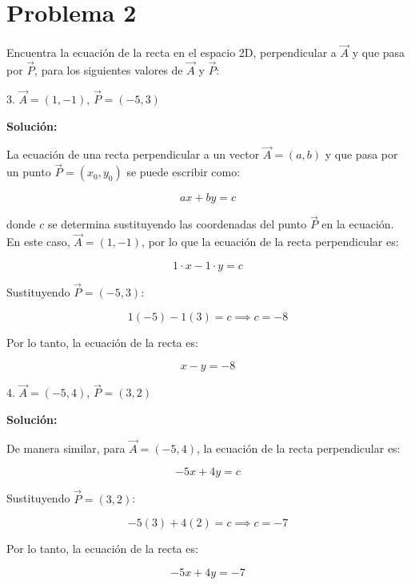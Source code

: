 \section*{Problema 2}

Encuentra la ecuación de la recta en el espacio 2D, perpendicular a $\vec{A}$ y que pasa por $\vec{P}$, para los siguientes valores de $\vec{A}$ y $\vec{P}$:

3. $\vec{A} = (1, -1)$, $\vec{P} = (-5, 3)$

\textbf{Solución:}

La ecuación de una recta perpendicular a un vector $\vec{A} = (a, b)$ y que pasa por un punto $\vec{P} = (x_0, y_0)$ se puede escribir como:

\[
ax + by = c
\]

donde $c$ se determina sustituyendo las coordenadas del punto $\vec{P}$ en la ecuación. En este caso, $\vec{A} = (1, -1)$, por lo que la ecuación de la recta perpendicular es:

\[
1 \cdot x - 1 \cdot y = c
\]

Sustituyendo $\vec{P} = (-5, 3)$:

\[
1(-5) - 1(3) = c \implies c = -8
\]

Por lo tanto, la ecuación de la recta es:

\[
x - y = -8
\]

4. $\vec{A} = (-5, 4)$, $\vec{P} = (3, 2)$

\textbf{Solución:}

De manera similar, para $\vec{A} = (-5, 4)$, la ecuación de la recta perpendicular es:

\[
-5x + 4y = c
\]

Sustituyendo $\vec{P} = (3, 2)$:

\[
-5(3) + 4(2) = c \implies c = -7
\]

Por lo tanto, la ecuación de la recta es:

\[
-5x + 4y = -7
\]
